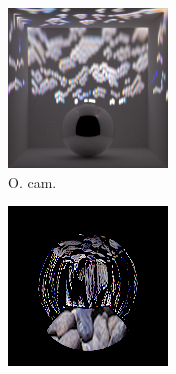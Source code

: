 \begin{figure}[]
\begin{subfigure}{\textwidth}
\begin{subfigure}{0.19\textwidth}
        \end{subfigure}
        \hfill
        \begin{subfigure}{0.19\textwidth}
            \centering
            \includegraphics[width=\textwidth]{images/04-experiment03/ball_dof/pebbles/stats_proj.jpg}
            \caption{O. cam.}
            \label{fig:ex03-ball_dof-pebbles-stats_proj}
        \end{subfigure}
        \hfill
        \begin{subfigure}{0.19\textwidth}
            \centering
            \includegraphics[width=\textwidth]{images/04-experiment03/ball_dof/pebbles/pixel_im.jpg}

\end{subfigure}
\end{subfigure}
\end{figure}
